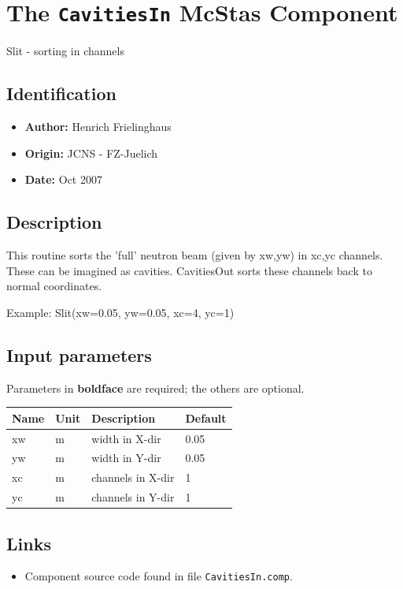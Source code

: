 \section{The \texttt{CavitiesIn} McStas Component}
Slit - sorting in channels

\subsection*{Identification}
\begin{itemize}
  \item \textbf{Author:} Henrich Frielinghaus
  \item \textbf{Origin:} JCNS - FZ-Juelich
  \item \textbf{Date:} Oct 2007
\end{itemize}

\subsection*{Description}
This routine sorts the 'full' neutron beam (given by xw,yw) in xc,yc channels. These can be imagined as cavities. CavitiesOut sorts these channels back to normal coordinates.

Example: Slit(xw=0.05, yw=0.05, xc=4, yc=1)

\subsection*{Input parameters}
Parameters in \textbf{boldface} are required; the others are optional.

\begin{longtable}{p{}p{}p{}p{}}
\toprule
\textbf{Name} & \textbf{Unit} & \textbf{Description} & \textbf{Default} \\
\midrule
\endhead
xw & m & width in X-dir & 0.05 \\
yw & m & width in Y-dir & 0.05 \\
xc & m & channels in X-dir & 1 \\
yc & m & channels in Y-dir & 1 \\
\bottomrule
\end{longtable}

\subsection*{Links}
\begin{itemize}
  \item Component source code found in file \texttt{CavitiesIn.comp}.
\end{itemize}
